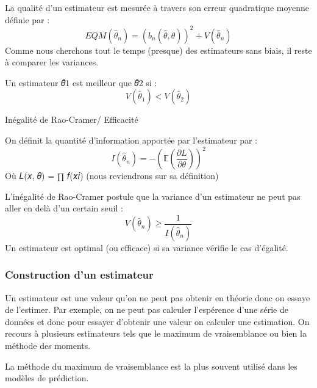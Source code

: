 \documentclass[
  letterpaper,
  DIV=11,
  numbers=noendperiod]{scrartcl}
\begin{document}
La qualité d'un estimateur est mesurée à travers son erreur quadratique
moyenne définie par :
\[EQM(\hat{\theta}_n) = (b_n(\hat{\theta}, \theta))^2 + V(\hat{\theta}_n)\]
Comme nous cherchons tout le temps (presque) des estimateurs sans biais,
il reste à comparer les variances.

Un estimateur 𝜃̂1 est meilleur que 𝜃̂2 si :
\[V(\hat{\theta}_1) < V(\hat{\theta}_2)\]

\textcolor{green!70!black}{Inégalité de Rao-Cramer/ Efficacité}

On définit la quantité d'information apportée par l'estimateur par : \[
I(\hat{\theta}_n) = -\left( \mathbb{E} \left( \frac{\partial L}{\partial \theta} \right) \right)^2
\] Où 𝐿(𝑥, 𝜃) = ∏ 𝑓(𝑥𝑖) (nous reviendrons sur sa définition)

L'inégalité de Rao-Cramer postule que la variance d'un estimateur ne
peut pas aller en delà d'un certain seuil :
\[V(\hat{\theta}_n) \geqslant \frac{1}{I(\hat{\theta}_n)}\] Un
estimateur est optimal (ou efficace) si sa variance vérifie le cas
d'égalité.

\newpage

\subsubsection{Construction d'un
estimateur}\label{construction-dun-estimateur}

Un estimateur est une valeur qu'on ne peut pas obtenir en théorie donc
on essaye de l'estimer. Par exemple, on ne peut pas calculer l'espérence
d'une série de données et donc pour essayer d'obtenir une valeur on
calculer une estimation. On recours à plusieurs estimateurs tels que le
maximum de vraisemblance ou bien la méthode des moments.

\begin{tcolorbox}[enhanced jigsaw, opacityback=0, toptitle=1mm, bottomtitle=1mm, rightrule=.15mm, colframe=quarto-callout-note-color-frame, leftrule=.75mm, titlerule=0mm, breakable, bottomrule=.15mm, colbacktitle=quarto-callout-note-color!10!white, coltitle=black, arc=.35mm, left=2mm, colback=white, toprule=.15mm, title=\textcolor{quarto-callout-note-color}{\faInfo}\hspace{0.5em}{Note}, opacitybacktitle=0.6]

La méthode du maximum de vraisemblance est la plus souvent utilisé dans
les modèles de prédiction.

\end{tcolorbox}
\end{document}

